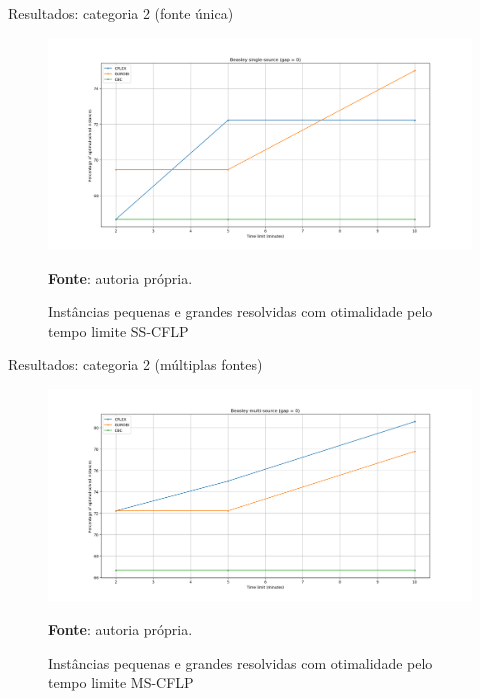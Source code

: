 \documentclass[aspectratio=169]{beamer}
\begin{document}
	\begin{frame}{Resultados: categoria 2 (fonte única)} %
		
		\begin{figure}[H]
			\begin{center}
				\caption{Instâncias pequenas e grandes resolvidas com otimalidade pelo tempo limite SS-CFLP \cite{Beasley}}
				
				\includegraphics[height=0.6\textheight]{res/Beasley SS - Optimal x Time.png}
				\label{Opt:T:SS:Beasley}
				
				\textbf{Fonte}: autoria própria.
			\end{center}
		\end{figure}
		
	\end{frame}

	\begin{frame}{Resultados: categoria 2 (múltiplas fontes)} %
		
		\begin{figure}[H]
			\begin{center}
				\caption{Instâncias pequenas e grandes resolvidas com otimalidade pelo tempo limite MS-CFLP \cite{Beasley}}
				
				\includegraphics[height=0.6\textheight]{res/Beasley MS - Optimal x Time.png}
				\label{Opt:T:MS:Beasley}
				
				\textbf{Fonte}: autoria própria.
			\end{center}
		\end{figure}
		
	\end{frame}
	
\end{document}
